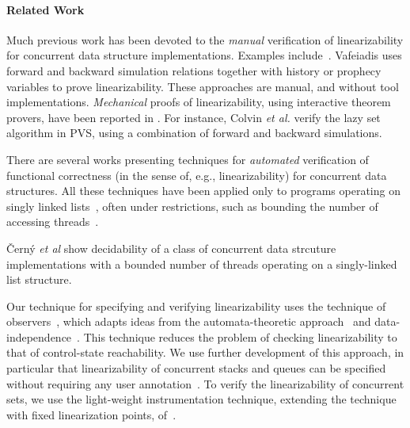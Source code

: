 \paragraph{Related Work}

Much previous work has been devoted to
the {\it manual} verification of linearizability for
concurrent data structure implementations. Examples
include~\cite{LF:pldi13,Aaron:locigcal:linearizability}.
%
Vafeiadis \cite{Vafeiadis:Thesis}
uses forward and backward simulation relations together
with history or prophecy variables to prove linearizability.
%
These approaches are manual, and without
tool implementations.
{\it Mechanical} proofs of linearizability, using interactive theorem
provers, have been reported in 
\cite{Colvin:Lazy-List,Derrick:fm14,SWD:cav12,SDW:tcl14}.
%
For instance, Colvin {\it et al.} \cite{Colvin:Lazy-List}
verify the lazy set algorithm in  PVS,
using a combination of forward and backward simulations.


There are several works presenting techniques for {\it automated} verification
of functional correctness (in the sense of, e.g., linearizability)
for concurrent data structures.
All these techniques have been applied only to programs operating on singly linked
lists~\cite{YaSa:queue,Sagiv:correlation,Amit:comparisonAbstraction,EQSST:tacas10,Vafeiadis:cav10,AHHR:integrated,meyer:vmcai16,Quy:sas16}, often under restrictions, such as bounding the number of accessing
threads~\cite{Amit:comparisonAbstraction,Vechev:spin09,CernyRZCA:CAV10}.

\v{C}ern{\'y} {\it et al} \cite{CernyRZCA:CAV10} show decidability of a class
of concurrent data strcuture implementations with a bounded number of threads operating on a singly-linked list structure.

Our technique for specifying and verifying linearizability uses the
technique of observers~\cite{AHHR:integrated}, which adapts ideas from
the automata-theoretic approach~\cite{VW:modelchecking} and
data-independence~\cite{Wolper:dataindependence}. This technique
reduces the problem of checking linearizability to that of control-state
reachability.
We use further development of this approach, in particular that linearizability
of concurrent stacks and queues can be specified without requiring any user
annotation~\cite{BEEH:icalp15,HSV:concur13}.
To verify the linearizability of concurrent sets, we use
the light-weight instrumentation technique, extending the technique with
fixed linearization points, of~\cite{Quy:sas16}.

